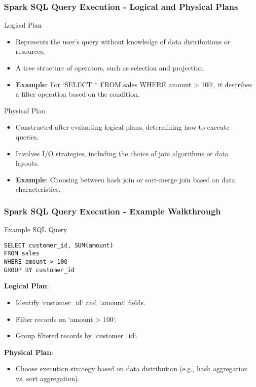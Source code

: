 \documentclass[aspectratio=169]{beamer}
\begin{document}
\begin{frame}[fragile]
    \frametitle{Spark SQL Query Execution - Logical and Physical Plans}
    \begin{block}{Logical Plan}
        \begin{itemize}
            \item Represents the user's query without knowledge of data distributions or resources.
            \item A tree structure of operators, such as selection and projection.
            \item \textbf{Example}: For `SELECT * FROM sales WHERE amount > 100`, it describes a filter operation based on the condition.
        \end{itemize}
    \end{block}

    \begin{block}{Physical Plan}
        \begin{itemize}
            \item Constructed after evaluating logical plans, determining how to execute queries.
            \item Involves I/O strategies, including the choice of join algorithms or data layouts.
            \item \textbf{Example}: Choosing between hash join or sort-merge join based on data characteristics.
        \end{itemize}
    \end{block}
\end{frame}

\begin{frame}[fragile]
    \frametitle{Spark SQL Query Execution - Example Walkthrough}
    \begin{block}{Example SQL Query}
        \begin{lstlisting}
SELECT customer_id, SUM(amount)
FROM sales
WHERE amount > 100
GROUP BY customer_id
        \end{lstlisting}
        
        \textbf{Logical Plan}:
        \begin{itemize}
            \item Identify `customer_id` and `amount` fields.
            \item Filter records on `amount > 100`.
            \item Group filtered records by `customer_id`.
        \end{itemize}

        \textbf{Physical Plan}:
        \begin{itemize}
            \item Choose execution strategy based on data distribution (e.g., hash aggregation vs. sort aggregation).
        \end{itemize}
    \end{block}
\end{frame}
\end{document}
